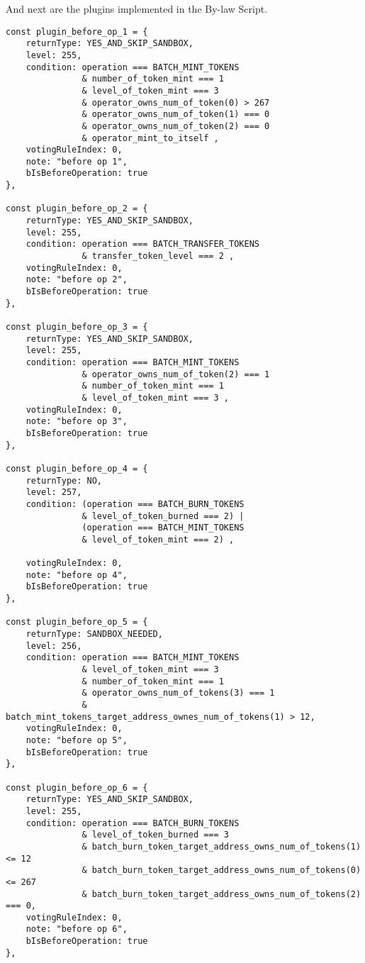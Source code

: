 \documentclass[main.tex]{subfiles}
\begin{document}
And next are the plugins implemented in the By-law Script.

\begin{verbatim}
const plugin_before_op_1 = {
    returnType: YES_AND_SKIP_SANDBOX,
    level: 255, 
    condition: operation === BATCH_MINT_TOKENS 
               & number_of_token_mint === 1 
               & level_of_token_mint === 3 
               & operator_owns_num_of_token(0) > 267 
               & operator_owns_num_of_token(1) === 0
               & operator_owns_num_of_token(2) === 0
               & operator_mint_to_itself ,
    votingRuleIndex: 0, 
    note: "before op 1",
    bIsBeforeOperation: true  
},

const plugin_before_op_2 = {
    returnType: YES_AND_SKIP_SANDBOX,
    level: 255, 
    condition: operation === BATCH_TRANSFER_TOKENS
               & transfer_token_level === 2 ,
    votingRuleIndex: 0, 
    note: "before op 2",
    bIsBeforeOperation: true  
},

const plugin_before_op_3 = {
    returnType: YES_AND_SKIP_SANDBOX,
    level: 255, 
    condition: operation === BATCH_MINT_TOKENS
               & operator_owns_num_of_token(2) === 1
               & number_of_token_mint === 1 
               & level_of_token_mint === 3 ,
    votingRuleIndex: 0, 
    note: "before op 3",
    bIsBeforeOperation: true  
},

const plugin_before_op_4 = {
    returnType: NO,
    level: 257, 
    condition: (operation === BATCH_BURN_TOKENS
               & level_of_token_burned === 2) |
               (operation === BATCH_MINT_TOKENS
               & level_of_token_mint === 2) ,

    votingRuleIndex: 0, 
    note: "before op 4",
    bIsBeforeOperation: true  
},

const plugin_before_op_5 = {
    returnType: SANDBOX_NEEDED,
    level: 256, 
    condition: operation === BATCH_MINT_TOKENS
               & level_of_token_mint === 3
               & number_of_token_mint === 1
               & operator_owns_num_of_tokens(3) === 1
               & batch_mint_tokens_target_address_ownes_num_of_tokens(1) > 12,
    votingRuleIndex: 0, 
    note: "before op 5",
    bIsBeforeOperation: true  
},

const plugin_before_op_6 = {
    returnType: YES_AND_SKIP_SANDBOX,
    level: 255, 
    condition: operation === BATCH_BURN_TOKENS
               & level_of_token_burned === 3
               & batch_burn_token_target_address_owns_num_of_tokens(1) <= 12
               & batch_burn_token_target_address_owns_num_of_tokens(0) <= 267
               & batch_burn_token_target_address_owns_num_of_tokens(2) === 0,
    votingRuleIndex: 0, 
    note: "before op 6",
    bIsBeforeOperation: true  
},


\end{verbatim}
\end{document}
